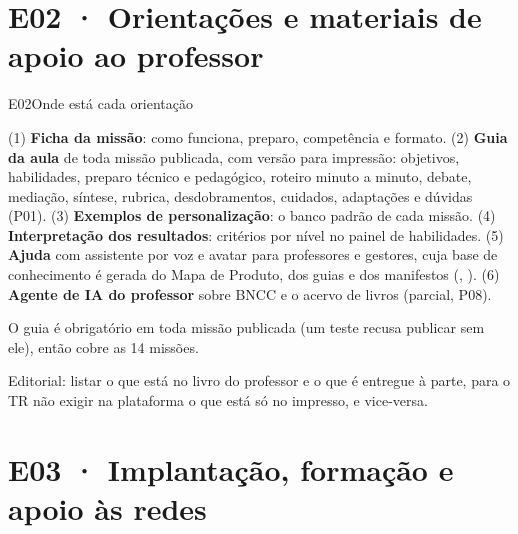 \section{E02 · Orientações e materiais de apoio ao professor}
\label{sec:e02}

\begin{resposta}{E02}{Onde está cada orientação}{\parcial}
\begin{campos}
  \item[Na plataforma] (1) \textbf{Ficha da missão}: como funciona, preparo,
    competência e formato. (2) \textbf{Guia da aula} de toda missão
    publicada, com versão para impressão: objetivos, habilidades, preparo
    técnico e pedagógico, roteiro minuto a minuto, debate, mediação,
    síntese, rubrica, desdobramentos, cuidados, adaptações e dúvidas (P01).
    (3) \textbf{Exemplos de personalização}: o banco padrão de cada missão.
    (4) \textbf{Interpretação dos resultados}: critérios por nível no painel
    de habilidades. (5) \textbf{Ajuda} com assistente por voz e avatar para
    professores e gestores, cuja base de conhecimento é gerada do Mapa de
    Produto, dos guias e dos manifestos (, ).
    (6) \textbf{Agente de IA do professor} sobre BNCC e o acervo de livros
    (parcial, P08).
  \item[Cobertura] O guia é obrigatório em toda missão publicada (um teste
    recusa publicar sem ele), então cobre as 14 missões.
  \item[Lacuna] Editorial: listar o que está no livro do professor e o que é
    entregue à parte, para o TR não exigir na plataforma o que está só no
    impresso, e vice-versa.
\end{campos}
\end{resposta}

\section{E03 · Implantação, formação e apoio às redes}
\label{sec:e03}

